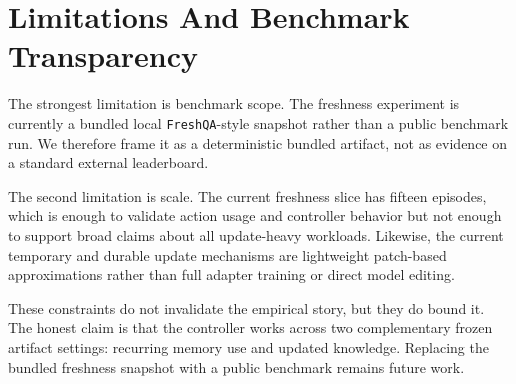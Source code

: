 \section{Limitations And Benchmark Transparency}

The strongest limitation is benchmark scope. The freshness experiment is currently a bundled local \texttt{FreshQA}-style snapshot rather than a public benchmark run. We therefore frame it as a deterministic bundled artifact, not as evidence on a standard external leaderboard.

The second limitation is scale. The current freshness slice has fifteen episodes, which is enough to validate action usage and controller behavior but not enough to support broad claims about all update-heavy workloads. Likewise, the current temporary and durable update mechanisms are lightweight patch-based approximations rather than full adapter training or direct model editing.

These constraints do not invalidate the empirical story, but they do bound it. The honest claim is that the controller works across two complementary frozen artifact settings: recurring memory use and updated knowledge. Replacing the bundled freshness snapshot with a public benchmark remains future work.
